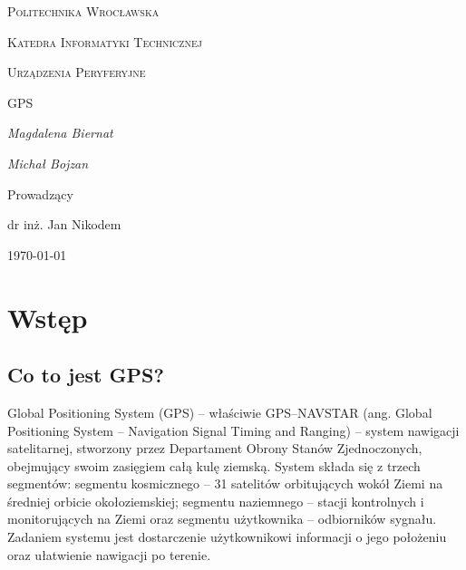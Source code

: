 \documentclass{article}
\begin{document}
	
	\begin{titlepage}
		\centering
		{\scshape\LARGE Politechnika Wrocławska \par}
		{\scshape\Large Katedra Informatyki Technicznej\par}
		
		\vspace{1.5cm}
		{\scshape\Large Urządzenia Peryferyjne \par}
		\vspace{1.5cm}
		{\scshape\Huge GPS}
		\vspace{1.5cm}
	
		\vspace{2cm}
		{\Large\itshape Magdalena Biernat\par}
		{\Large\itshape Michał Bojzan \par}
		\vfill\flushleft\large
	
		
		\normalsize	\centering	\vspace{3cm}
		Prowadzący\par
		dr inż. Jan Nikodem 

		\vfill
		{\large \today\par}
	\end{titlepage}

	\newpage
\section{Wstęp}
\subsection{Co to jest GPS?}
Global Positioning System (GPS) – właściwie GPS–NAVSTAR (ang. Global Positioning System – Navigation Signal Timing and Ranging) – system nawigacji satelitarnej, stworzony przez Departament Obrony Stanów Zjednoczonych, obejmujący swoim zasięgiem całą kulę ziemską. System składa się z trzech segmentów: segmentu kosmicznego – 31 satelitów orbitujących wokół Ziemi na średniej orbicie okołoziemskiej; segmentu naziemnego – stacji kontrolnych i monitorujących na Ziemi oraz segmentu użytkownika – odbiorników sygnału. Zadaniem systemu jest dostarczenie użytkownikowi informacji o jego położeniu oraz ułatwienie nawigacji po terenie.
\end{document}
